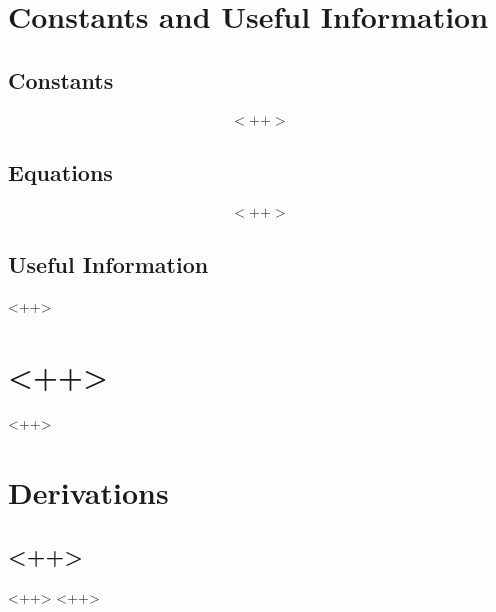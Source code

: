 \documentclass[a4paper]{report}
\begin{document}
	\ctitlecontents{<++>}{<++>}
	
	\chapter{Constants and Useful Information}
		\section{Constants}
			\begin{align}
				<++>
			\end{align}

		\section{Equations}
			\begin{align}
				<++>
			\end{align}
		
		\section{Useful Information}
			<++>
	

	\chapter{<++>}
	\begin{multicols}{2}
		<++>
		
	\end{multicols}

	\chapter{Derivations}
		\section{<++>}
			<++>
		<++>
\end{document}
